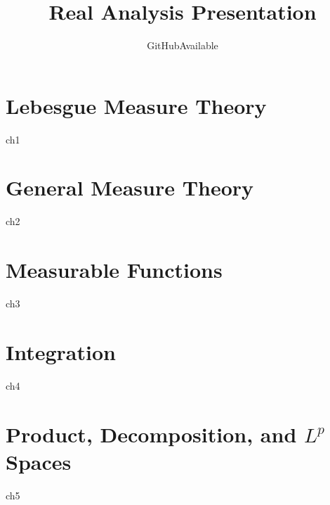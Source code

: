 \documentclass[openany]{book}
\title{Real Analysis Presentation}
\author{GitHubAvailable}
\begin{document}
\maketitle

\frontmatter  %

{
    \hypersetup{linkcolor=blue}
    \tableofcontents
}

\mainmatter  %

\chapter{Lebesgue Measure Theory}
{ch1}

\chapter{General Measure Theory}
{ch2}

\chapter{Measurable Functions}
{ch3}

\chapter{Integration}
{ch4}

\chapter{Product, Decomposition, and $L^p$ Spaces}
{ch5}
\end{document}
